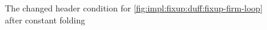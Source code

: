 \begin{figure}[H]
    \centering
    
    \caption{The changed header condition for \cref{fig:impl:fixup:duff:fixup-firm-loop} after constant folding}
    \label{fig:impl:fixup:header-cond:firm}
\end{figure}